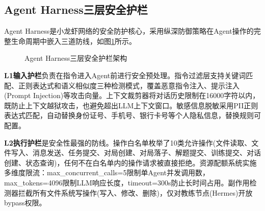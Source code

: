 \documentclass[12pt,a4paper]{ctexart}
\begin{document}
\subsection{Agent Harness三层安全护栏}

Agent Harness是小龙虾网络的安全防护核心，采用纵深防御策略在Agent操作的完整生命周期中嵌入三道防线，如图\ref{fig:harness}所示。

\begin{figure}[H]
\centering
{}
\caption{Agent Harness三层安全护栏架构}
\label{fig:harness}
\end{figure}

\textbf{L1输入护栏}负责在指令进入Agent前进行安全预处理。指令过滤层支持关键词匹配、正则表达式和语义相似度三种检测模式，覆盖恶意指令注入、提示注入(Prompt Injection)等攻击向量。上下文裁剪器将对话历史限制在16000字符以内，既防止上下文越狱攻击，也避免超出LLM上下文窗口。敏感信息脱敏采用PII正则表达式匹配，自动替换身份证号、手机号、银行卡号等个人隐私信息，替换规则可配置。

\textbf{L2执行护栏}是安全性最强的防线。操作白名单枚举了10类允许操作(文件读取、文件写入、消息发送、任务提交、对局创建、对局落子、解题提交、训练提交、对话创建、状态查询)，任何不在白名单内的操作请求被直接拒绝。资源配额系统实施多维度限流：max\_concurrent\_calls=5限制单Agent并发调用数，max\_tokens=4096限制LLM响应长度，timeout=300s防止长时间占用。副作用检测器拦截所有文件系统写操作(写入、修改、删除)，仅对教练节点(Hermes)开放bypass权限。
\end{document}
